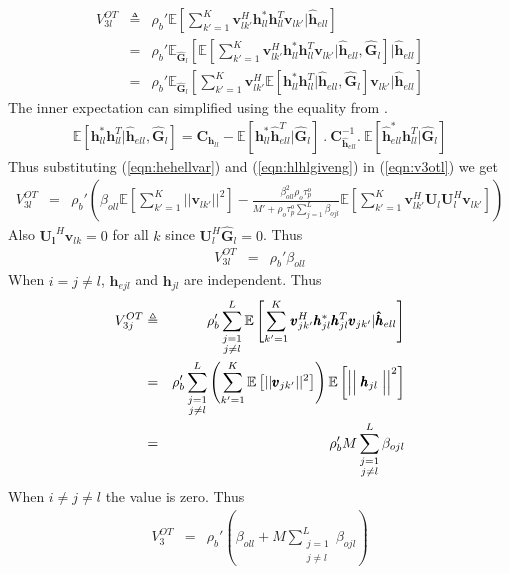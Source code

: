 \documentclass[10pt, a4paper, twoside,fleqn]{article}
\begin{document}
\begin{eqnarray}\label{eqn:v3otl}
     V_{3l}^{OT} &\triangleq& \rho_b' \mathbb{E}\left[\sum_{k'=1}^{K} \pmb{v}_{lk'}^H \pmb{h}_{ll}^*  \pmb{h}_{ll}^T\pmb{v}_{lk'}| \pmb{\hat h}_{ell} \right] \nonumber \\
            &=& \rho_b' \mathbb{E}_{\pmb{\widehat{G}}_l}\left[\mathbb{E}\left[\sum_{k'=1}^{K} \pmb{v}^H_{lk'} \pmb{h}_{ll}^* \pmb{h}_{ll}^T \pmb{v}_{lk'}| \pmb{\hat h}_{ell},  \pmb{\widehat{G}}_{l} \right] | \pmb{\hat h}_{ell}\right] \nonumber \\
            &=& \rho_b' \mathbb{E}_{\pmb{\widehat{G}}_l}\left[\sum_{k'=1}^{K}\pmb{v}^H_{lk'} \mathbb{E}\left[ \pmb{h}_{ll}^*  \pmb{h}^T_{ll} | \pmb{\hat h}_{ell},  \pmb{\widehat{G}}_{l} \right] \pmb{v}_{lk'}| \pmb{\hat h}_{ell}\right]
\end{eqnarray}
The inner expectation can simplified using the equality from \cite{bib:rmtBook}.
\begin{eqnarray}\label{eqn:hlhlgiveng}
	\mathbb{E}[\pmb{h}_{ll}^*\pmb{h}^T_{ll}|\pmb{\hat h}_{ell}, \pmb{\widehat{G}}_{l}] = \pmb{C}_{\pmb{h}_{ll}}-\mathbb{E}[\pmb{h}_{ll}^* \pmb{\hat h}^T_{ell}| \pmb{\widehat{G}}_{l}] \ . \ \pmb{C}_{\pmb{\hat h}_{ell}}^{-1} .\ \mathbb{E}[\pmb{\hat h}_{ell}^* \pmb{h}_{ll}^T| \pmb{\widehat{G}}_{l}]
\end{eqnarray}
Thus substituting (\ref{eqn:hehellvar}) and (\ref{eqn:hlhlgiveng}) in (\ref{eqn:v3otl}) we get
\begin{eqnarray}\label{eqn:otv3}
	V_{3l}^{OT} &=& \rho_b'\left( \beta_{oll} \mathbb{E}\left[\sum_{k'=1}^{K}||\pmb{v}_{lk'}||^2\right]
					- \frac{\beta_{oll}^{2}\rho_o\tau_p^o}{M'+\rho_o\tau_p^o\sum\limits_{j=1}^{L}\beta_{ojl}} \mathbb{E}\left[\sum_{k'=1}^{K} \pmb{v}_{lk'}^H \pmb{U}_l \pmb{U}_l^H \pmb{v}_{lk'}\right]\right)
\end{eqnarray}
Also $\pmb{U_l}^H\pmb{v}_{lk}=0$ for all $k$ since $\pmb{U}_l^H\pmb{\widehat{G}}_l=0$. Thus
\begin{eqnarray}
       	V_{3l}^{OT} &=& \rho_b'\beta_{oll}
\end{eqnarray}
When $i=j\neq l$, $\pmb{\hat h}_{ejl}$ and $\pmb{h}_{jl}$ are independent. Thus
\begin{eqnarray}\label{eqn:v3jot}
V_{3j}^{OT} &\triangleq& \rho_b' \sum_{\substack{j=1 \\ j\neq l}}^{L} \mathbb{E}\left[\sum_{k'=1}^{K} \pmb{v}_{jk'}^H \pmb{h}_{jl}^*  \pmb{h}_{jl}^T \pmb{v}_{jk'}| \pmb{\hat h}_{ell} \right] \nonumber \\
           &=&  \rho_b' \sum_{\substack{j=1 \\ j\neq l}}^{L}\left(\sum_{k'=1}^{K} \mathbb{E}\left[||\pmb{v}_{jk'}||^2\right]\right)\mathbb{E}\left[ \Bigm|\Bigm|\pmb{h}_{jl}\Bigm|\Bigm|^2\right] \nonumber \\
           &=&\rho_b'M \sum_{\substack{j=1 \\ j\neq l}}^{L}\beta_{ojl}
\end{eqnarray}
When $i\neq j\neq l$ the value is zero. Thus
\begin{eqnarray}
V_3^{OT} &=&\rho_b' \left(\beta_{oll}+ M \sum_{\substack{j=1 \\ j\neq l}}^{L}\beta_{ojl}\right)
\end{eqnarray}
\end{document}
